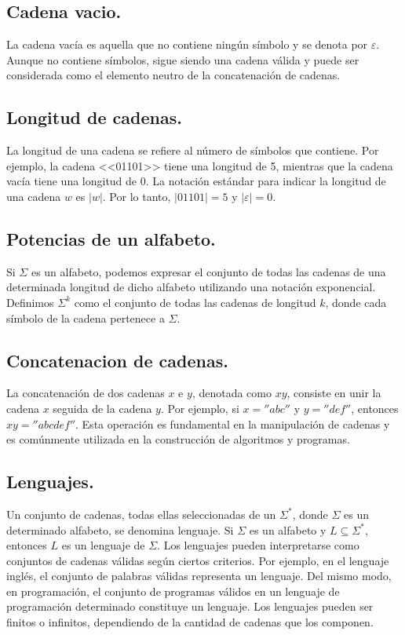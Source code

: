 \documentclass{article}
\begin{document}
    \subsection{Cadena vacio.}
        La cadena vacía es aquella que no contiene ningún símbolo y se denota por $\varepsilon$. Aunque no contiene símbolos, sigue
        siendo una cadena válida y puede ser considerada como el elemento neutro de la concatenación de cadenas.\cite{hopcroft2007introduccion}

    \subsection{Longitud de cadenas.}
        La longitud de una cadena se refiere al número de símbolos que contiene. Por ejemplo, la cadena <<01101>> tiene una longitud
        de 5, mientras que la cadena vacía tiene una longitud de 0. La notación estándar para indicar la longitud de una cadena $w$
        es $|w|$. Por lo tanto, $|01101| = 5$ y $|\varepsilon| = 0$.\cite{hopcroft2007introduccion}

    \subsection{Potencias de un alfabeto.}
        Si $\Sigma$ es un alfabeto, podemos expresar el conjunto de todas las cadenas de una determinada longitud de dicho alfabeto
        utilizando una notación exponencial. Definimos $\Sigma^k$ como el conjunto de todas las cadenas de longitud $k$, donde cada
        símbolo de la cadena pertenece a $\Sigma$.\cite{hopcroft2007introduccion}

    \subsection{Concatenacion de cadenas.}
        La concatenación de dos cadenas $x$ e $y$, denotada como $xy$, consiste en unir la cadena $x$ seguida de la cadena $y$.
        Por ejemplo, si $x = ''abc''$ y $y = ''def''$, entonces $xy = ''abcdef''$. Esta operación es fundamental en la manipulación de cadenas
        y es comúnmente utilizada en la construcción de algoritmos y programas.\cite{hopcroft2007introduccion}
    \subsection{Lenguajes.}
    Un conjunto de cadenas, todas ellas seleccionadas de un $\Sigma^*$, donde $\Sigma$ es un determinado alfabeto, se denomina
    lenguaje. Si $\Sigma$ es un alfabeto y $L \subseteq \Sigma^*$, entonces $L$ es un lenguaje de $\Sigma$. Los lenguajes pueden
    interpretarse como conjuntos de cadenas válidas según ciertos criterios. Por ejemplo, en el lenguaje inglés, el conjunto de
    palabras válidas representa un lenguaje. Del mismo modo, en programación, el conjunto de programas válidos en un lenguaje de
    programación determinado constituye un lenguaje. Los lenguajes pueden ser finitos o infinitos, dependiendo de la cantidad de
    cadenas que los componen.\cite{hopcroft2007introduccion}
\end{document}
